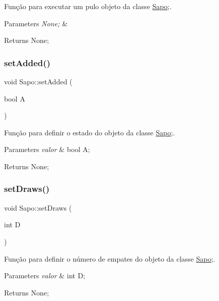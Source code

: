 Função para executar um pulo objeto da classe \mbox{\hyperlink{class_sapo}{Sapo}};. 


\begin{DoxyParams}{Parameters}
{\em None;} & \\
\hline
\end{DoxyParams}
\begin{DoxyReturn}{Returns}
None; 
\end{DoxyReturn}
\mbox{\label{class_sapo_a4998802c220373e4c6a099d752d9fa69}} 
\subsubsection{\texorpdfstring{set\+Added()}{setAdded()}}
{\footnotesize\ttfamily void Sapo\+::set\+Added (\begin{DoxyParamCaption}\item[{bool}]{A }\end{DoxyParamCaption})}



Função para definir o estado do objeto da classe \mbox{\hyperlink{class_sapo}{Sapo}};. 


\begin{DoxyParams}{Parameters}
{\em valor} & bool A; \\
\hline
\end{DoxyParams}
\begin{DoxyReturn}{Returns}
None; 
\end{DoxyReturn}
\mbox{\label{class_sapo_a5b4e93e3210e13e5513c99ffea5a8d48}} 
\subsubsection{\texorpdfstring{set\+Draws()}{setDraws()}}
{\footnotesize\ttfamily void Sapo\+::set\+Draws (\begin{DoxyParamCaption}\item[{int}]{D }\end{DoxyParamCaption})}



Função para definir o número de empates do objeto da classe \mbox{\hyperlink{class_sapo}{Sapo}};. 


\begin{DoxyParams}{Parameters}
{\em valor} & int D; \\
\hline
\end{DoxyParams}
\begin{DoxyReturn}{Returns}
None; 
\end{DoxyReturn}
\mbox{\label{class_sapo_a3a1c9bc7901bc6e85ec60d406be2f081}} 
